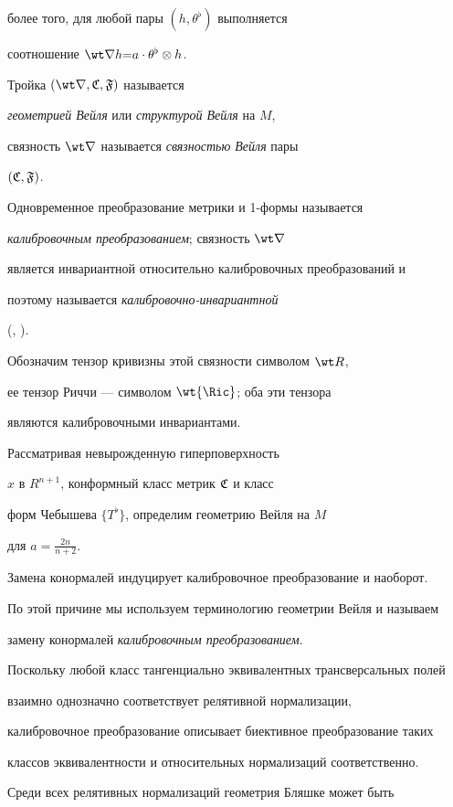 более того, для любой пары $(h, \theta^{\flat})$ выполняется

соотношение $\wt \nabla h{=}a \cdot \theta^{\flat} \otimes h$.

Тройка $(\wt \nabla,\frak C, \frak F)$ называется

{\it геометрией Вейля} или {\it структурой Вейля} на $M$,

связность $\wt \nabla$ называется {\it связностью Вейля} пары

$(\frak C, \frak F)$.

Одновременное преобразование метрики и 1-формы называется

{\it калибровочным преобразованием}; связность $\wt \nabla$

является инвариантной относительно калибровочных преобразований и

поэтому называется {\it калибровочно-инвариантной}

(\cite{FOL}, \cite{BOK-G-S-2}).

Обозначим тензор кривизны этой связности символом $\wt R$,

ее тензор Риччи --- символом $\wt {\Ric}$; оба эти тензора

являются калибровочными инвариантами.



Рассматривая невырожденную гиперповерхность

$x$ в $R^{n+1}$, конформный класс метрик $\frak C$ и класс

форм Чебышева $\{ T^{\flat} \}$, определим геометрию Вейля на $M$

для $a=\frac {2n}{n+2}$.

Замена конормалей индуцирует калибровочное преобразование и наоборот.

По этой причине мы используем терминологию геометрии Вейля и называем

замену конормалей {\it калибровочным преобразованием}.

Поскольку любой класс тангенциально эквивалентных трансверсальных полей

взаимно однозначно соответствует релятивной нормализации,

калибровочное преобразование описывает биективное преобразование таких

классов эквивалентности и относительных нормализаций соответственно.



Среди всех релятивных нормализаций геометрия Бляшке может быть

